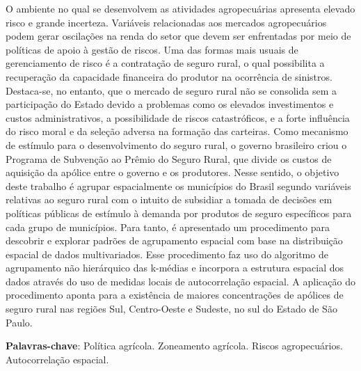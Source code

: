 \documentclass[
	12pt,				%
	openright,			%
	oneside,			%
	a4paper,			%
	chapter=TITLE,		%
	section=TITLE,		%
	english,			%
	french,				%
	spanish,			%
	brazil				%
	]{abntex2}
\begin{document}
\setlength{\absparsep}{18pt} %
\begin{resumo}
\noindent O ambiente no qual se desenvolvem as atividades agropecuárias apresenta elevado risco e grande incerteza. Variáveis relacionadas aos mercados agropecuários podem gerar oscilações na renda do setor que devem ser enfrentadas por meio de políticas de apoio à gestão de riscos. Uma das formas mais usuais de gerenciamento de risco é a contratação de seguro rural, o qual possibilita a recuperação da capacidade financeira do produtor na ocorrência de sinistros. Destaca-se, no entanto, que o mercado de seguro rural não se consolida sem a participação do Estado devido a problemas como os elevados investimentos e custos administrativos, a possibilidade de riscos catastróficos, e a forte influência do risco moral e da seleção adversa na formação das carteiras. Como mecanismo de estímulo para o desenvolvimento do seguro rural, o governo brasileiro criou o Programa de Subvenção ao Prêmio do Seguro Rural, que divide os custos de aquisição da apólice entre o governo e os produtores. Nesse sentido, o objetivo deste trabalho é agrupar espacialmente os municípios do Brasil segundo variáveis relativas ao seguro rural com o intuito de subsidiar a tomada de decisões em políticas públicas de estímulo à demanda por produtos de seguro específicos para cada grupo de municípios. Para tanto, é apresentado um procedimento para descobrir e explorar padrões de agrupamento espacial com base na distribuição espacial de dados multivariados. Esse procedimento faz uso do algoritmo de agrupamento não hierárquico das k-médias e incorpora a estrutura espacial dos dados através do uso de medidas locais de autocorrelação espacial. A aplicação do procedimento aponta para a existência de maiores concentrações de apólices de seguro rural nas regiões Sul, Centro-Oeste e Sudeste, no sul do Estado de São Paulo. 
   
    \vspace{\onelineskip}
 
   \noindent 
   \textbf{Palavras-chave}: Política agrícola. Zoneamento agrícola. Riscos agropecuários. Autocorrelação espacial.
 
\end{resumo}
\end{document}
